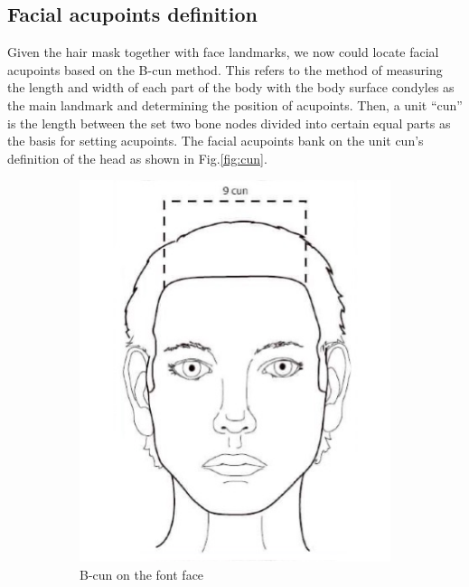 \subsection{Facial acupoints definition}
\label{sec:implement-facial-acu-define}
Given the hair mask together with face landmarks, we now could locate facial acupoints based on the B-cun method. This refers to the method of measuring the length and width of each part of the body with the body surface condyles as the main landmark and determining the position of acupoints. Then, a unit “cun” is the length between the set two bone nodes divided into certain equal parts as the basis for setting acupoints. The facial acupoints bank on the unit cun’s definition of the head as shown in Fig.\ref{fig:cun}. 
\begin{figure}
  \centering
  \begin{subfigure}[t]{0.45\columnwidth}
      \centering
      \includegraphics[width=\textwidth]{figures/b-cun-2.jpg}
      \caption{B-cun on the font face}
      \label{fig:cun-front}
  \end{subfigure}%
  ~ 
  \begin{subfigure}[t]{0.45\columnwidth}

\end{subfigure}
\end{figure}
